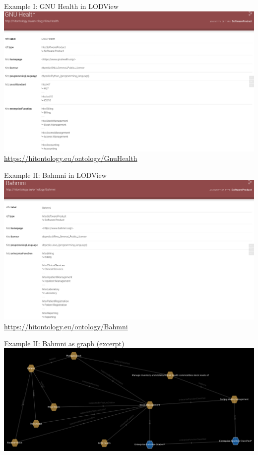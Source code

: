 \documentclass[aspectratio=1610,12pt]{beamer}
\begin{document}
\begin{frame}{Example I: GNU Health in LODView}
\vspace{-0.3cm}
\centering
\includegraphics[width=.95\textwidth]{img/GnuHealth.png}
\footnotesize{\url{https://hitontology.eu/ontology/GnuHealth}}
\end{frame}

\begin{frame}{Example II: Bahmni in LODView}
\vspace{-0.3cm}
\centering
\includegraphics[width=.95\textwidth]{img/bahmni.png}
\footnotesize{\url{https://hitontology.eu/ontology/Bahmni}}
\end{frame}

\begin{frame}{Example II: Bahmni as graph (excerpt)}
\includegraphics[width=\textwidth, height=.65\textheight]{img/bahmni_star.png}
\end{frame}
\end{document}
